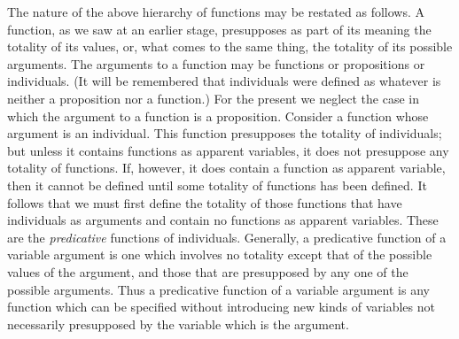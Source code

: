 \documentclass[letterpaper,12pt,openany,leqno]{book}
\newcommand{\pagefirst}[1]{\marginnote[\boxed{\text{#1}}]{\boxed{\text{#1}}}}
\begin{document}
\pagefirst{57} The nature of the above hierarchy of functions may be restated as follows. A function, as we saw at an earlier stage, presupposes as part of its meaning the totality of its values, or, what comes to the same thing, the totality of its possible arguments. The arguments to a function may be functions or propositions or individuals. (It will be remembered that individuals were defined as whatever is neither a proposition nor a function.) For the present we neglect the case in which the argument to a function is a proposition. Consider a function whose argument is an individual. This function presupposes the totality of individuals; but unless it contains functions as apparent variables, it does not presuppose any totality of functions. If, however, it does contain a function as apparent variable, then it cannot be defined until some totality of functions has been defined. It follows that we must first define the totality of those functions that have individuals as arguments and contain no functions as apparent variables. These are the \textit{predicative} functions of individuals. Generally, a predicative function of a variable argument is one which involves no totality except that of the possible values of the argument, and those that are presupposed by any one of the possible arguments. Thus a predicative function of a variable argument is any function which can be specified without introducing new kinds of variables not necessarily presupposed by the variable which is the argument.
\end{document}
